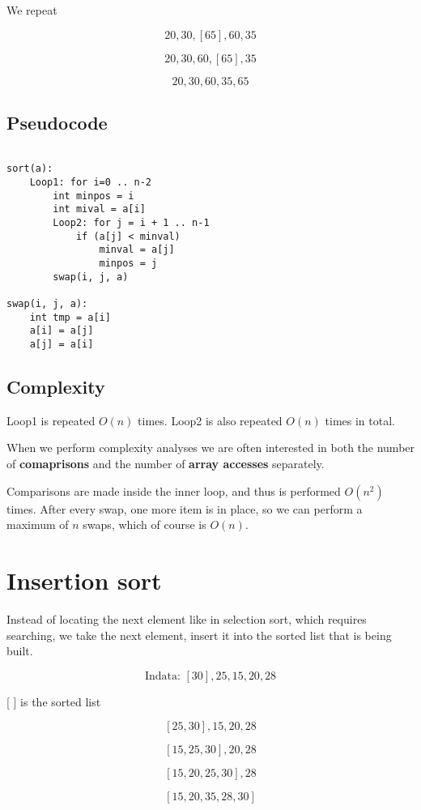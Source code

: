 \documentclass{article}
\begin{document}
We repeat

$$ 20, 30, [65], 60, 35 $$

$$ 20, 30,  60, [65], 35 $$

$$ 20, 30,  60, 35, 65 $$

\subsection{Pseudocode}

\begin{verbatim}

sort(a):
    Loop1: for i=0 .. n-2
        int minpos = i
        int mival = a[i]
        Loop2: for j = i + 1 .. n-1
            if (a[j] < minval)
                minval = a[j]
                minpos = j
        swap(i, j, a)

swap(i, j, a):
    int tmp = a[i]
    a[i] = a[j]
    a[j] = a[i]
\end{verbatim}

\subsection{Complexity}

Loop1 is repeated $O(n)$ times. Loop2 is also repeated $O(n)$ times in total.

When we perform complexity analyses we are often interested in both the number of \textbf{comaprisons} and the number of \textbf{array accesses} separately.

Comparisons are made inside the inner loop, and thus is performed $O(n^2)$ times. After every swap, one more item is in place, so we can perform a maximum of $n$ swaps, which of course is $O(n)$.

\section{Insertion sort}

Instead of locating the next element like in selection sort, which requires searching, we take the next element, insert it into the sorted list that is being built.

$$\text{Indata: } [30],25,15,20,28$$

[  ] is the sorted list

$$[25, 30], 15, 20,28$$

$$[15, 25, 30], 20, 28 $$

$$[15, 20, 25, 30], 28$$

$$[15, 20, 35, 28, 30]$$
\end{document}
